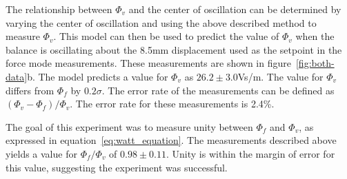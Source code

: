 \documentclass[aps,prstab,reprint,12pt]{revtex4-1}
\begin{document}
The relationship between $\Phi_v$ and the center of oscillation can be determined by varying the center of oscillation and using the above described method to measure $\Phi_v$. This model can then be used to predict the value of $\Phi_v$ when the balance is oscillating about the 8.5mm displacement used as the setpoint in the force mode measurements. These measurements are shown in figure~\ref{fig:both-data}b. The model predicts a value for $\Phi_v$ as $26.2 \pm 3.0$\si{Vs/m}. The value for $\Phi_v$ differs from $\Phi_f$ by $0.2\sigma$. The error rate of the measurements can be defined as $(\Phi_v-\Phi_f)/\Phi_v$. The error rate for these measurements is 2.4\%.

The goal of this experiment was to measure unity between $\Phi_f$ and $\Phi_v$, as expressed in equation~\ref{eq:watt_equation}. The measurements described above yields a value for $\Phi_f/\Phi_v$ of $0.98 \pm 0.11$. Unity is within the margin of error for this value, suggesting the experiment was successful. 
















\end{document}

